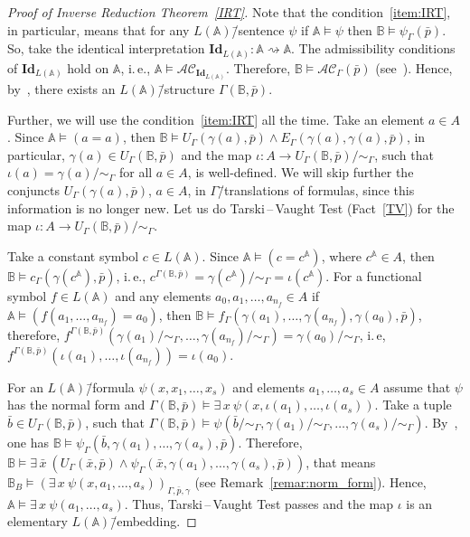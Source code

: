 \documentclass[12pt]{article}
\theoremstyle{definition}
\def\MA{{\mathbb{A}}}
\def\MB{{\mathbb{B}}}
\def\AC{\mathcal {AC}}
\def\Id{{\mathbf{Id}}}
\begin{document}
\begin{proof}[Proof of Inverse Reduction Theorem~\ref{IRT}]
Note that the condition~\ref{item:IRT}, in particular, means that 
for any $L(\MA)$\=/sentence $\psi$ if $\MA\models \psi$ then $\MB\models\psi_\Gamma(\bar p)$. So, take the identical interpretation $\Id_{L(\MA)}\colon \MA\rightsquigarrow\MA$. The admissibility conditions of $\Id_{L(\MA)}$ hold on $\MA$, i.\,e., $\MA\models \AC_{\Id_{L(\MA)}}$. Therefore, $\MB\models\AC_{\Gamma}(\bar p)$ (see~\cite[Remark~12]{Th_int1}). Hence, by~\cite[Proposition~1]{Th_int1}, there exists an $L(\MA)$\=/structure $\Gamma(\MB,\bar p)$. 

Further, we will use the condition~\ref{item:IRT} all the time. Take an element $a\in A$. Since $\MA\models (a=a)$, then $\MB\models U_\Gamma(\gamma(a),\bar p)\wedge E_\Gamma(\gamma(a),\gamma(a),\bar p)$, in particular, $\gamma(a)\in U_\Gamma(\MB,\bar p)$ and the map $\iota\colon A\to U_\Gamma(\MB,\bar p)/{\sim_\Gamma}$, such that $\iota(a)=\gamma(a)/{\sim_\Gamma}$ for all $a\in A$, is well-defined. We will skip further the conjuncts $U_\Gamma(\gamma(a),\bar p)$, $a\in A$, in $\Gamma$\=/translations of formulas, since this information is no longer new. Let us do Tarski\,--\,Vaught Test (Fact~\ref{TV}) for the map $\iota\colon A\to U_\Gamma(\MB,\bar p)/{\sim_\Gamma}$.  

Take a constant symbol $c\in L(\MA)$. Since $\MA\models (c=c^\MA)$, where $c^\MA\in A$, then $\MB\models c_\Gamma(\gamma(c^\MA),\bar p)$, i.\,e., $c^{\Gamma(\MB,\bar p)}=\gamma(c^\MA)/{\sim_\Gamma}=\iota(c^\MA)$. For a functional symbol $f\in L(\MA)$ and any elements $a_0,a_1,\ldots,a_{n_f}\in A$ if $\MA\models (f(a_1,\ldots,a_{n_f})=a_0)$, then $\MB\models f_\Gamma(\gamma(a_1),\ldots,\gamma(a_{n_f}),\gamma(a_0),\bar p)$, therefore, $f^{\Gamma(\MB,\bar p)}(\gamma(a_1)/{\sim_\Gamma},\ldots,\gamma(a_{n_f})/{\sim_\Gamma})=\gamma(a_0)/{\sim_\Gamma}$, i.\,e, $f^{\Gamma(\MB,\bar p)}(\iota(a_1),\ldots,\iota(a_{n_f}))=\iota(a_0)$. 

For an $L(\MA)$\=/formula $\psi(x, x_1,\ldots,x_s)$ and elements $a_1,\ldots,a_s\in A$ assume that $\psi$ has the normal form and $\Gamma(\MB,\bar p)\models \exists\,x\: \psi(x,\iota(a_1),\ldots,\iota(a_s))$. Take a tuple $\bar b\in U_\Gamma(\MB,\bar p)$, such that $\Gamma(\MB,\bar p)\models  \psi(\bar b/{\sim_\Gamma},\gamma(a_1)/{\sim_\Gamma},\ldots,\gamma(a_s)/{\sim_\Gamma})$. By~\cite[Corollary~2]{Th_int1}, one has $\MB\models \psi_\Gamma(\bar b, \gamma(a_1),\ldots,\gamma(a_s),\bar p)$. Therefore, $\MB\models \exists \,\bar x\: (U_\Gamma(\bar x,\bar p)\wedge\psi_\Gamma (\bar x,\gamma(a_1),\ldots,\gamma(a_s),\bar p))$, that means $\MB_B\models(\exists \,x\: \psi(x,a_1,\ldots,a_s))_{\Gamma,\bar p,\gamma}$ (see Remark~\ref{remar:norm_form}). Hence, $\MA\models \exists\,x\:\psi(a_1,\ldots,a_s)$. Thus, Tarski\,--\,Vaught Test passes and the  map $\iota$ is an elementary $L(\MA)$\=/embedding.
\end{proof}
\end{document}
